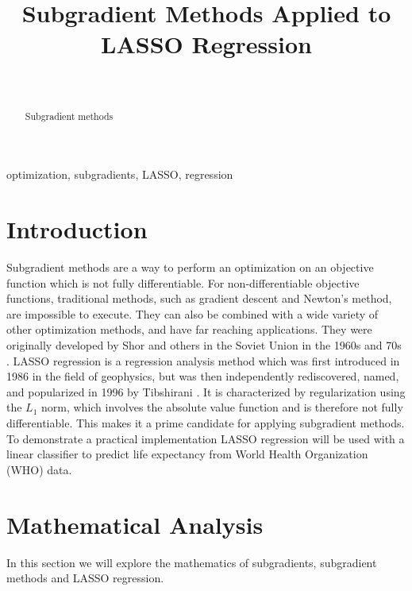 \documentclass[journal,onecolumn]{IEEEtran}
\begin{document}
\title{
Subgradient Methods Applied to LASSO Regression
}

\author{\\
}


\maketitle

\begin{abstract}
Subgradient methods
\end{abstract}

\begin{IEEEkeywords}
optimization, subgradients, LASSO, regression
\end{IEEEkeywords}

\section{Introduction}\label{sec:intro}
Subgradient methods are a way to perform an optimization on an objective function which is not fully differentiable. For non-differentiable objective functions, traditional methods, such as gradient descent and Newton's method, are impossible to execute. They can also be combined with a wide variety of other optimization methods, and have far reaching applications. They were originally developed by Shor and others in the Soviet Union in the 1960s and 70s \cite{boydparksubgradients} \cite{boydxiaosubgradients}. LASSO regression is a regression analysis method which was first introduced in 1986 \cite{lassooriginal} in the field of geophysics, but was then independently rediscovered, named, and popularized in 1996 by Tibshirani \cite{lassopaper}. It is characterized by regularization using the \(L_1\) norm, which involves the absolute value function and is therefore not fully differentiable. This makes it a prime candidate for applying subgradient methods. To demonstrate a practical implementation LASSO regression will be used with a linear classifier to predict life expectancy from World Health Organization (WHO) data.


\section{Mathematical Analysis}\label{sec:math}
In this section we will explore the mathematics of subgradients, subgradient methods and LASSO regression.
\end{document}
